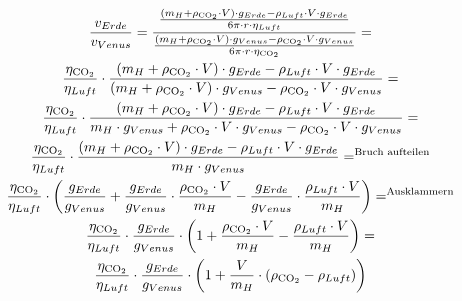 \documentclass{article}
\begin{document}
          \begin{equation}
              \begin{gathered} \label{eq:geschwindigkeiten_verhältnis}
                  \frac{ v_{Erde} }{ v_{Venus} } =
                  \frac{
                      \frac{ \left( m_H + \rho_{\ce{CO2}} \cdot V \right) \cdot g_{Erde} - \rho_{Luft} \cdot V \cdot g_{Erde} }{ 6 \pi \cdot r \cdot \eta_{Luft} } }{
                      \frac{ \left( m_H + \rho_{\ce{CO2}} \cdot V \right) \cdot g_{Venus} - \rho_{\ce{CO2}} \cdot V \cdot g_{Venus} }{ 6 \pi \cdot r \cdot \eta_{\ce{CO2}} }
                  } = \\
                  \frac{ \eta_{\ce{CO2}}}{ \eta_{Luft} } \cdot
                  \frac{
                      \left( m_H + \rho_{\ce{CO2}} \cdot V \right) \cdot g_{Erde} - \rho_{Luft} \cdot V \cdot g_{Erde} }{
                      \left( m_H + \rho_{\ce{CO2}} \cdot V \right) \cdot g_{Venus} - \rho_{\ce{CO2}} \cdot V \cdot g_{Venus}
                  } = \\
                  \frac{ \eta_{\ce{CO2}}}{ \eta_{Luft} } \cdot
                  \frac{
                      \left( m_H + \rho_{\ce{CO2}} \cdot V \right) \cdot g_{Erde} - \rho_{Luft} \cdot V \cdot g_{Erde} }{
                      m_H \cdot g_{Venus} + \rho_{\ce{CO2}} \cdot V \cdot g_{Venus} - \rho_{\ce{CO2}} \cdot V \cdot g_{Venus}
                  } = \\
                  \frac{ \eta_{\ce{CO2}}}{ \eta_{Luft} } \cdot
                  \frac{
                      \left( m_H + \rho_{\ce{CO2}} \cdot V \right) \cdot g_{Erde} - \rho_{Luft} \cdot V \cdot g_{Erde} }{
                      m_H \cdot g_{Venus}
                  } =^{\text{Bruch aufteilen}} \\
                  \frac{ \eta_{\ce{CO2}}}{ \eta_{Luft} } \cdot
                  \left(
                  \frac{ g_{Erde} }{ g_{Venus} } +
                  \frac{ g_{Erde} }{ g_{Venus} } \cdot \frac{ \rho_{\ce{CO2}} \cdot V }{m_H} -
                  \frac{ g_{Erde} }{ g_{Venus} } \cdot \frac{ \rho_{Luft} \cdot V }{ m_H }
                  \right) =^{\text{Ausklammern}} \\
                  \frac{ \eta_{\ce{CO2}}}{ \eta_{Luft} } \cdot \frac{ g_{Erde} }{ g_{Venus} } \cdot
                  \left( 1 + \frac{ \rho_{\ce{CO2}} \cdot V }{m_H} - \frac{ \rho_{Luft} \cdot V }{ m_H } \right) = \\
                  \frac{ \eta_{\ce{CO2}}}{ \eta_{Luft} } \cdot \frac{ g_{Erde} }{ g_{Venus} } \cdot
                  \left( 1 + \frac{V}{m_H} \cdot \left( \rho_{\ce{CO2}} - \rho_{Luft} \right) \right)
              \end{gathered}
          \end{equation}
\end{document}
